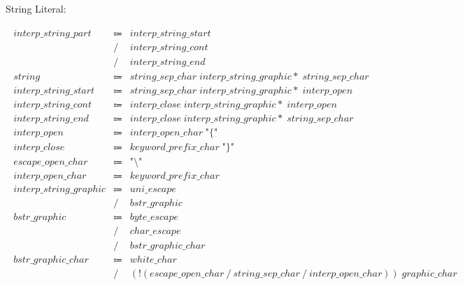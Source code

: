 String Literal:

\begin{align*}
    \begin{array}{rcll}
        \mathit{interp\_string\_part}
        &\Coloneq &\mathit{interp\_string\_start} \\
        &\mathrel{/} &\mathit{interp\_string\_cont} \\
        &\mathrel{/} &\mathit{interp\_string\_end} \\
        \mathit{string}
        &\Coloneq &\mathit{string\_sep\_char}\; \mathit{interp\_string\_graphic}{*}\; \mathit{string\_sep\_char} \\
        \mathit{interp\_string\_start}
        &\Coloneq &\mathit{string\_sep\_char}\; \mathit{interp\_string\_graphic}{*}\; \mathit{interp\_open} \\
        \mathit{interp\_string\_cont}
        &\Coloneq &\mathit{interp\_close}\; \mathit{interp\_string\_graphic}{*}\; \mathit{interp\_open} \\
        \mathit{interp\_string\_end}
        &\Coloneq &\mathit{interp\_close}\; \mathit{interp\_string\_graphic}{*}\; \mathit{string\_sep\_char} \\
        \mathit{interp\_open}
        &\Coloneq &\mathit{interp\_open\_char}\; \texttt{"\{"} \\
        \mathit{interp\_close}
        &\Coloneq &\mathit{keyword\_prefix\_char}\; \texttt{"\}"} \\
        \mathit{escape\_open\_char}
        &\Coloneq &\texttt{"\textbackslash"} \\
        \mathit{interp\_open\_char}
        &\Coloneq &\mathit{keyword\_prefix\_char} \\
        \mathit{interp\_string\_graphic}
        &\Coloneq &\mathit{uni\_escape} \\
        &\mathrel{/} &\mathit{bstr\_graphic} \\
        \mathit{bstr\_graphic}
        &\Coloneq &\mathit{byte\_escape} \\
        &\mathrel{/} &\mathit{char\_escape} \\
        &\mathrel{/} &\mathit{bstr\_graphic\_char} \\
        \mathit{bstr\_graphic\_char}
        &\Coloneq &\mathit{white\_char} \\
        &\mathrel{/} &(\mathop{!} (\mathit{escape\_open\_char} \mathrel{/} \mathit{string\_sep\_char} \mathrel{/} \mathit{interp\_open\_char}))\; \mathit{graphic\_char} \\

\end{array}
\end{align*}
